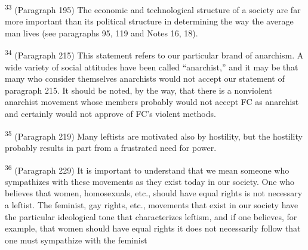 \documentclass{article}
\begin{document}
\textsuperscript{33} (Paragraph 195) The economic and technological structure of a society are far more important 
than its political structure in determining the way the average man lives (see paragraphs 95, 119 
and Notes 16, 18). \vspace{\baselineskip}

\textsuperscript{34} (Paragraph 215) This statement refers to our particular brand of anarchism. A wide variety of social 
attitudes have been called “anarchist,” and it may be that many who consider themselves anarchists would 
not accept our statement of paragraph 215. It should be noted, by the way, that there is a nonviolent 
anarchist movement whose members probably would not accept FC as anarchist and certainly would not 
approve of FC’s violent methods. \vspace{\baselineskip}

\textsuperscript{35} (Paragraph 219) Many leftists are motivated also by hostility, but the hostility probably results 
in part from a frustrated need for power. \vspace{\baselineskip}

\textsuperscript{36} (Paragraph 229) It is important to understand that we mean someone who sympathizes with 
these movements as they exist today in our society. One who believes that women, 
homosexuals, etc., should have equal rights is not necessary a leftist. The feminist, gay rights, 
etc., movements that exist in our society have the particular ideological tone that characterizes 
leftism, and if one believes, for example, that women should have equal rights it does not 
necessarily follow that one must sympathize with the feminist
\end{document}
